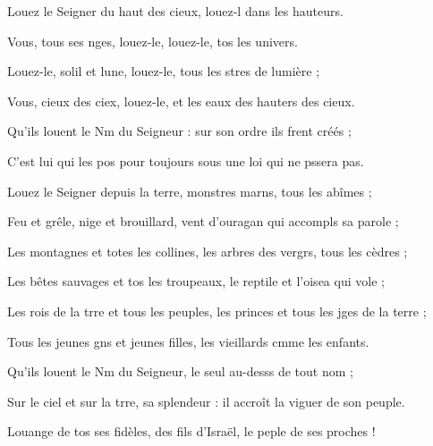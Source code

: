 \item Louez le Seigner du haut des cieux,\psstar{} louez-l dans les hauteurs.
\item Vous, tous ses nges, louez-le,\psstar{} louez-le, tos les univers.
\item Louez-le, solil et lune,\psstar{} louez-le, tous les stres de lumière ;
\item Vous, cieux des ciex, louez-le,\psstar{} et les eaux des hauters des cieux.
\item Qu’ils louent le Nm du Seigneur :\psstar{} sur son ordre ils frent créés ;
\item C’est lui qui les pos pour toujours\psstar{} sous une loi qui ne pssera pas.
\item Louez le Seigner depuis la terre,\psstar{} monstres marns, tous les abîmes ;
\item Feu et grêle, nige et brouillard,\psstar{} vent d’ouragan qui accompls sa parole ; 
\item Les montagnes et totes les collines,\psstar{} les arbres des vergrs, tous les cèdres ;
\item Les bêtes sauvages et tos les troupeaux,\psstar{} le reptile et l’oisea qui vole ;
\item Les rois de la trre et tous les peuples,\psstar{} les princes et tous les jges de la terre ;
\item Tous les jeunes gns et jeunes filles,\psstar{} les vieillards cmme les enfants.
\item Qu’ils louent le Nm du Seigneur,\psstar{} le seul au-desss de tout nom ; 
\item Sur le ciel et sur la trre, sa splendeur :\psstar{} il accroît la viguer de son peuple. 
\item Louange de tos ses fidèles,\psstar{} des fils d’Israël, le peple de ses proches !